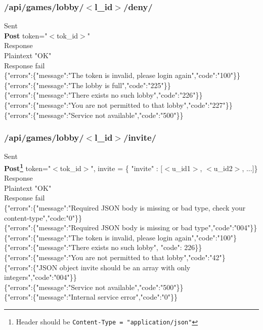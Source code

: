 \subsubsection{/api/games/lobby/$<$l\_id$>$/deny/}
\tab	Sent\\
\tab\tab	\textbf{Post} token="$<$tok\_id$>$"\\
\tab	Response\\
\tab\tab	Plaintext "OK"\\
\tab	Response fail\\
\tab\tab	\{"errors":\{"message":"The token is invalid, please login again","code":"100"\}\}\\
\tab\tab	\{"errors":\{"message":"The lobby is full","code":"225"\}\}\\
\tab\tab	\{"errors":\{"message":"There exists no such lobby","code":"226"\}\}\\
\tab\tab	\{"errors":\{"message":"You are not permitted to that lobby","code":"227"\}\}\\
\tab\tab	\{"errors":\{"message":"Service not available","code":"500"\}\}\\

\subsubsection{/api/games/lobby/$<$l\_id$>$/invite/}
\tab	Sent \\
\tab\tab	\textbf{Post\footnote{Header should be \tt{Content-Type = "application/json"}}} token="$<$tok\_id$>$", invite = \{ "invite" : $[$$<$u\_id1$>$, $<$u\_id2$>$, ...$]$\}\\
\tab	Response\\
\tab\tab	Plaintext "OK"\\
\tab	Response fail\\
\tab\tab	\{"errors":\{"message":"Required JSON body is missing or bad type, check your content-type","code:"0"\}\}\\
\tab\tab	\{"errors":\{"message":"Required JSON body is missing or bad type","code":"004"\}\}\\
\tab\tab	\{"errors":\{"message":"The token is invalid, please login again","code":"100"\}\\
\tab\tab	\{"errors":\{"message":"There exists no such lobby", "code": 226\}\}\\
\tab\tab	\{"errors":\{"message":"You are not permitted to that lobby","code":"42"\}\\
\tab\tab	\{"errors":\{"JSON object invite should be an array with only integers","code":"004"\}\}\\
\tab\tab	\{"errors":\{"message":"Service not available","code":"500"\}\}\\
\tab\tab	\{"errors":\{"message":"Internal service error","code":"0"\}\}\\


